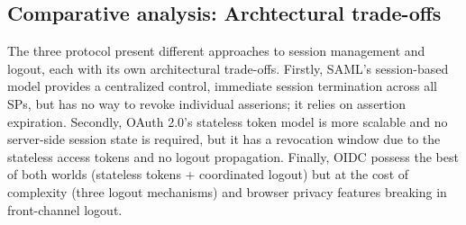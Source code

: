 \documentclass[../memoire.tex]{subfiles}
\begin{document}
\subsection{Comparative analysis: Archtectural trade-offs}

The three protocol present different approaches to session management and logout, each with its own architectural trade-offs. Firstly, SAML's session-based model provides a centralized control, immediate session termination across all SPs, but has no way to revoke individual asserions; it relies on assertion expiration. Secondly, OAuth 2.0's stateless token model is more scalable and no server-side session state is required, but it has a revocation window due to the stateless access tokens and no logout propagation. Finally, OIDC possess the best of both worlds (stateless tokens + coordinated logout) but at the cost of complexity (three logout mechanisms) and browser privacy features breaking in front-channel logout.

\end{document}
